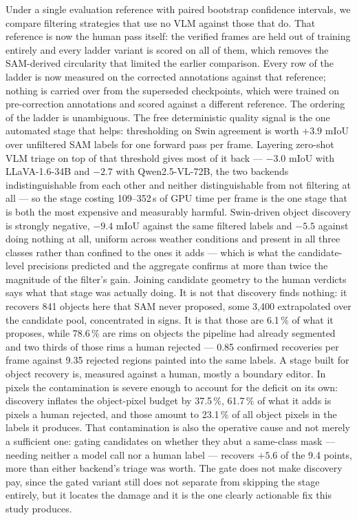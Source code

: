 \documentclass[conference]{IEEEtran}
\begin{document}
Under a single evaluation reference with paired bootstrap confidence intervals, we compare filtering strategies that use no VLM against those that do. That reference is now the human pass itself: the verified frames are held out of training entirely and every ladder variant is scored on all of them, which removes the SAM-derived circularity that limited the earlier comparison. Every row of the ladder is now measured on the corrected annotations against that reference; nothing is carried over from the superseded checkpoints, which were trained on pre-correction annotations and scored against a different reference.
The ordering of the ladder is unambiguous. The free deterministic quality signal is the one automated stage that helps: thresholding on Swin agreement is worth $+3.9$ mIoU over unfiltered SAM labels for one forward pass per frame. Layering zero-shot VLM triage on top of that threshold gives most of it back --- $-3.0$ mIoU with LLaVA-1.6-34B and $-2.7$ with Qwen2.5-VL-72B, the two backends indistinguishable from each other and neither distinguishable from not filtering at all --- so the stage costing 109--352\,s of GPU time per frame is the one stage that is both the most expensive and measurably harmful. Swin-driven object discovery is strongly negative, $-9.4$ mIoU against the same filtered labels and $-5.5$ against doing nothing at all, uniform across weather conditions and present in all three classes rather than confined to the ones it adds --- which is what the candidate-level precisions predicted and the aggregate confirms at more than twice the magnitude of the filter's gain.
Joining candidate geometry to the human verdicts says what that stage was actually doing. It is not that discovery finds nothing: it recovers 841 objects here that SAM never proposed, some 3{,}400 extrapolated over the candidate pool, concentrated in signs. It is that those are 6.1\,\% of what it proposes, while 78.6\,\% are rims on objects the pipeline had already segmented and two thirds of those rims a human rejected --- 0.85 confirmed recoveries per frame against 9.35 rejected regions painted into the same labels. A stage built for object recovery is, measured against a human, mostly a boundary editor. In pixels the contamination is severe enough to account for the deficit on its own: discovery inflates the object-pixel budget by 37.5\,\%, 61.7\,\% of what it adds is pixels a human rejected, and those amount to 23.1\,\% of all object pixels in the labels it produces. That contamination is also the operative cause and not merely a sufficient one: gating candidates on whether they abut a same-class mask --- needing neither a model call nor a human label --- recovers $+5.6$ of the 9.4 points, more than either backend's triage was worth. The gate does not make discovery pay, since the gated variant still does not separate from skipping the stage entirely, but it locates the damage and it is the one clearly actionable fix this study produces.
\end{document}
